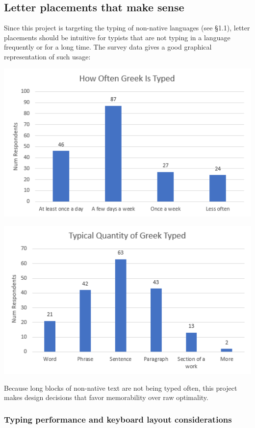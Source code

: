 \documentclass[11pt]{article}
\begin{document}
\subsection{Letter placements that make sense}
\label{sec:orgf1e7a79}

Since this project is targeting the typing of non-native languages (see §1.1), letter placements should be intuitive for typists that are not typing in a language frequently or for a long time. The survey data gives a good graphical representation of such usage:

\begin{center}
\includegraphics[width=.9\linewidth]{./images/typing-frequency.PNG}
\end{center}

\begin{center}
\includegraphics[width=.9\linewidth]{./images/typing-quantity.PNG}
\end{center}

Because long blocks of non-native text are not being typed often, this project makes design decisions that favor memorability over raw optimality.

\subsubsection{Typing performance and keyboard layout considerations}
\label{sec:org08e3908}
\end{document}
